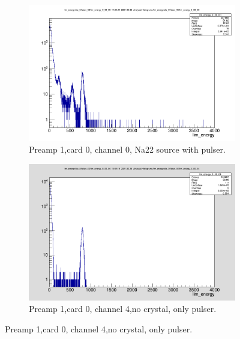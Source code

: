 \documentclass{report}
\begin{document}
\begin{figure}[!htb]
  \centering
  \begin{subfigure}[b]{0.45\textwidth}
    \includegraphics[width=\linewidth]{preamp1_lim_energy_card0_ch0.png}
    \caption{Preamp 1,card 0, channel 0, Na22 source with pulser.}
  \end{subfigure}
  \begin{subfigure}[b]{0.45\textwidth}
    \includegraphics[width=\linewidth]{preamp1_lim_energy_card0_ch4_no_crystal.png}
    \caption{Preamp 1,card 0, channel 4,no crystal, only pulser.}
  \end{subfigure}
\end{figure}
\end{document}
